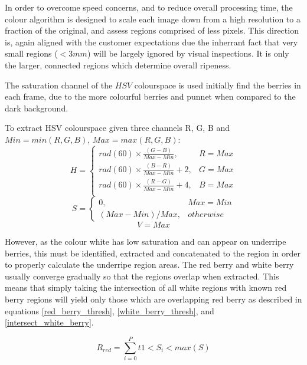 \documentclass[fleqn,twoside,12pt]{report}
\begin{document}
In order to overcome speed concerns, and to reduce overall processing time, the colour algorithm is designed to scale each image down from a high resolution to a fraction of the original, and assess regions comprised of less pixels. This direction is, again aligned with the customer expectations due the inherrant fact that very small regions ($<3mm$) will be largely ignored by visual inspections. It is only the larger, connected regions which determine overall ripeness.

The saturation channel of the $HSV$ colourspace is used initially find the berries in each frame, due to the more colourful berries and punnet when compared to the dark background. 

To extract HSV colourspace given three channels R, G, B and $Min = min(R, G, B)$, $Max = max(R, G, B)$:
\begin{equation}
H = 
\begin{cases} 
rad(60) \times \frac{(G-B)}{Max-Min}, & R=Max \\
rad(60) \times \frac{(B-R)}{Max-Min} + 2, & G=Max \\
rad(60) \times \frac{(R-G)}{Max-Min} + 4, & B=Max \\   
\end{cases}
\end{equation}
\begin{equation}
S = 
\begin{cases} 
0, & Max=Min \\   
(Max-Min)/Max, & otherwise        
\end{cases}
\end{equation}
\begin{equation}
V = Max
\end{equation}


However, as the colour white has low saturation and can appear on underripe berries, this must be identified, extracted and concatenated to the region in order to properly calculate the underripe region areas. The red berry and white berry usually converge gradually so that the regions overlap when extracted. This means that simply taking the intersection of all white regions with known red berry regions will yield only those which are overlapping red berry as described in equations \ref{red_berry_thresh}, \ref{white_berry_thresh}, and \ref{intersect_white_berry}.

\begin{equation}
R_{red} = \sum_{i=0}^{P}t1<S_i<max(S)
\label{red_berry_thresh}
\end{equation}
\end{document}
